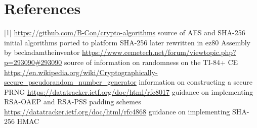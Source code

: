 \documentclass[titlepage]{article}
\begin{document}
		\section{References}
			[1] \href{https://github.com/B-Con/crypto-algorithms/}{{\underline{https://github.com/B-Con/crypto-algorithms}}\label{bcon}}
			\tabto{5mm}source of AES and SHA-256 initial algorithms ported to platform\newline
			\tabto{5mm}SHA-256 later rewritten in ez80 Assembly by beckadamtheinventor\newline
			\newline
			[2] \href{https://www.cemetech.net/forum/viewtopic.php?p=293090#293090}{{\underline{ https://www.cemetech.net/forum/viewtopic.php?p=293090\#293090}}\label{cemetech}}
			\tabto{5mm}source of information on randomness on the TI-84+ CE\newline
			\newline
			[3] \href{https://en.wikipedia.org/wiki/Cryptographically-secure_pseudorandom_number_generator}{{\underline{ https://en.wikipedia.org/wiki/Cryptographically-secure\_pseudorandom\_number\_generator}}\label{csprng}}
			\tabto{5mm}information on constructing a secure PRNG\newline
			\newline
			[5] \href{https://datatracker.ietf.org/doc/html/rfc8017}{{\underline{https://datatracker.ietf.org/doc/html/rfc8017}}\label{oaep}}
			\tabto{5mm}guidance on implementing RSA-OAEP and RSA-PSS padding schemes\newline
			\newline
			[6] \href{https://datatracker.ietf.org/doc/html/rfc4868}{{\underline{https://datatracker.ietf.org/doc/html/rfc4868}}\label{hmac}}
			\tabto{5mm}guidance on implementing SHA-256 HMAC\newline
\end{document}
